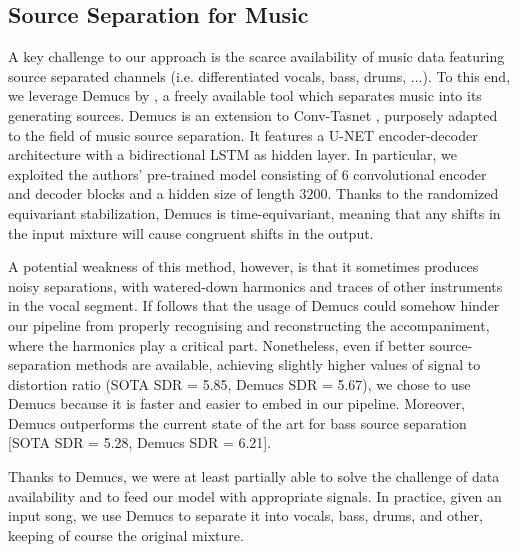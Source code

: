 \documentclass[journal]{IEEEtran}
\begin{document}
\subsection{Source Separation for Music}

A key challenge to our approach is the scarce availability of music data featuring source separated channels (i.e. differentiated vocals, bass, drums, ...). To this end, we leverage Demucs by \cite{defossez2019demucs}, a freely available tool which separates music into its generating sources. Demucs is an extension to Conv-Tasnet \cite{Luo2019ConvTasNetSI}, purposely adapted to the field of music source separation. It features a U-NET encoder-decoder architecture with a bidirectional LSTM as %
hidden layer. In particular, we exploited the authors' pre-trained model consisting of 6 convolutional encoder and decoder blocks and a 
hidden size of length $3200$. Thanks to the randomized equivariant stabilization, Demucs is time-equivariant, meaning that any shifts in the input mixture will cause congruent shifts in the output. 

A potential weakness of this method, however, is that it sometimes produces noisy separations, with watered-down harmonics and traces of other instruments in the vocal segment. If follows that the usage of Demucs could somehow hinder our pipeline from properly recognising and  reconstructing the accompaniment, where the harmonics play a critical part. Nonetheless, even if better source-separation methods are available, achieving slightly higher values of signal to distortion ratio (SOTA SDR = 5.85, Demucs SDR = 5.67), we chose to use Demucs because it is faster and easier to embed in our pipeline. Moreover, Demucs outperforms the current state of the art for bass source separation [SOTA SDR = 5.28, Demucs SDR = 6.21]. %

Thanks to Demucs, we were at least partially able to solve the challenge of data availability and to feed our model with appropriate signals. In practice, given an input song, we use Demucs to separate it into vocals, bass, drums, and other, keeping of course the original mixture.


\end{document}
